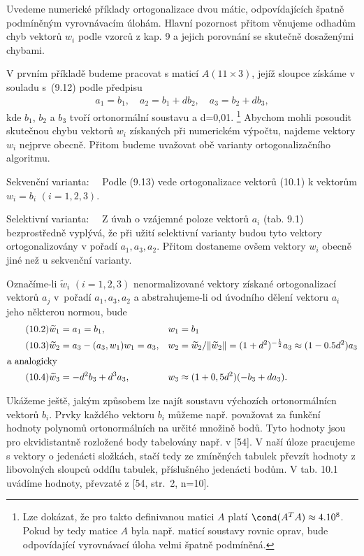 { \newcommand{\TS}[1]{\textsuperscript{#1}}

Uvedeme  numerické příklady ortogonalizace dvou mátic,
odpovídajících špatně podmíněným vyrovnávacím úlohám. Hlavní
pozornost přitom věnujeme odhadům chyb vektorů $w_i$ podle vzorců z
kap. 9 a jejich porovnání se skutečně dosaženými chybami.


 V prvním příkladě budeme pracovat s maticí $A(11 \times 3)$,
jejíž sloupce získáme v souladu s~(9.12) podle předpisu
%
\begin{align*}
  \tag{10.1}
  a_1 = b_1, \quad a_2 = b_1 + db_2, \quad a_3 = b_2 + db_3,
\end{align*}
%
kde $b_1$, $b_2$ a $b_3$ tvoří ortonormální soustavu a d=0,01.%
\footnote{
Lze dokázat, že pro takto definivanou matici $A$ platí
$\cond (A^TA) \approx 4.10^8$. Pokud by tedy matice $A$ byla např.
maticí soustavy rovnic oprav, bude odpovídající vyrovnávací
úloha velmi špatně podmíněná.
}
%
Abychom mohli posoudit skutečnou chybu vektorů $w_i$ získaných při
numerickém výpočtu, najdeme vektory $w_i$ nejprve obecně. Přitom budeme
uvažovat obě varianty ortogonalizačního algoritmu.

Sekvenční varianta:~~ Podle (9.13) vede ortogonalizace vektorů
(10.1) k vektorům $w_i = b_i$ $(i=1,2,3)$.


Selektivní varianta:~~ Z úvah o vzájemné poloze vektorů $a_i$
(tab. 9.1) bezprostředně vyplývá, že při užití selektivní varianty
budou tyto vektory ortogonalizovány v pořadí $a_1,a_3,a_2$. Přitom
dostaneme ovšem vektory $w_i$ obecně jiné než u sekvenční varianty.


Označíme-li $\widetilde w_i$  $(i=1,2,3)$ nenormalizované vektory získané
ortogonalizací vektorů $a_j$ v~pořadí $a_1,a_3,a_2$ a abstrahujeme-li od
úvodního dělení vektoru $a_i$ jeho některou normou, bude
%
\begin{align*}
  \tag{10.2}
  \widetilde w_1 &= a_1 = b_1,    &w_1 &= b_1\\
  \tag{10.3}
  \widetilde w_2 &= a_3 - (a_3,w_1)w_1 = a_3,
  &w_2 &= \widetilde w_2 / \Vert \widetilde w_2 \Vert =
  (1+d^2)^{-{1\over2}}a_3 \approx (1-0.5d^2)a_3\\
  \intertext{a analogicky}
  \tag{10.4}
  \widetilde w_3 &= -d^2b_3 + d^3a_3,
  &w_3 &\approx (1+0,5d^2)(-b_3+da_3).
  \\
\end{align*}


Ukážeme  ještě, jakým způsobem lze najít soustavu výchozích
ortonormálnícn vektorů $b_i$. Prvky každého vektoru $b_i$ můžeme např.
považovat za funkční hodnoty polynomů ortonormálních na určité množině
bodů. Tyto hodnoty jsou pro ekvidistantně rozložené body tabelovány
např. v [54]. V naší úloze pracujeme s vektory o jedenácti složkách,
stačí tedy ze zmíněných tabulek převzít hodnoty z libovolných sloupců
oddílu tabulek, příslušného jedenácti bodům. V tab. 10.1 uvádíme
hodnoty, převzaté z [54, str.~2, n=10].


}

